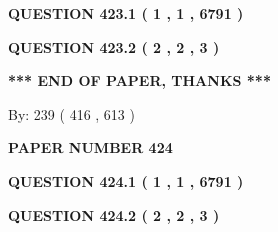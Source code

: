 \documentclass[12pt]{article}
\begin{document}
   
   
   
 \vspace{0.2in}
 
 
 
 
   
   
  
\vspace{0.2in}
  
{\textbf{\Large{QUESTION
423.1 
 ( 1 , 1 , 6791 )
}}}
  
  
  
\vspace{0.2in}
  
{\textbf{\Large{QUESTION
423.2 
 ( 2 , 2 , 3 )
}}}
  
  
   
   
 \vspace{0.2in}
 
   
   
   
   
\vspace{1.0in} 
{\textbf{\large{ *** END OF PAPER, THANKS *** }}} 
   
   
\hspace{1.0in} By: 
 239 ( 416 ,  613 )
   
   
   
   
\newpage 
\setcounter{page}{ 
   424001 } 
   
   
   
   
 {\textbf{ \Large{ PAPER NUMBER  424  }}}
   
   
\vspace{0.2in}
   
   
   
   
   
   
 \vspace{0.2in}
 
 
 
 
   
   
  
\vspace{0.2in}
  
{\textbf{\Large{QUESTION
424.1 
 ( 1 , 1 , 6791 )
}}}
  
  
  
\vspace{0.2in}
  
{\textbf{\Large{QUESTION
424.2 
 ( 2 , 2 , 3 )
}}}
  
  
   
   
 \vspace{0.2in}
 
\end{document}
